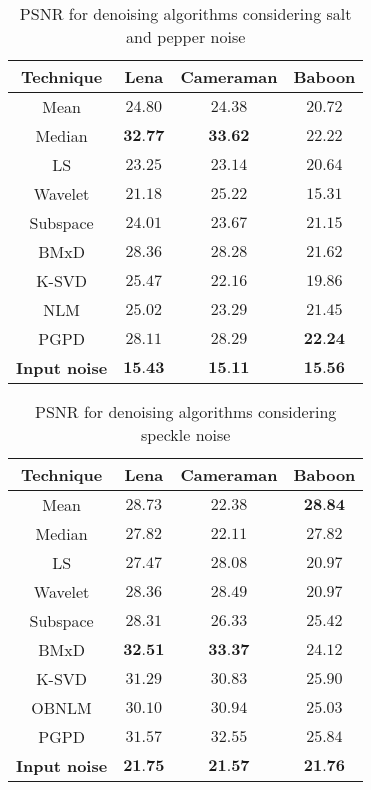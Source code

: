 \begin{table}[H]
	\centering
	\caption{PSNR for denoising algorithms considering salt and pepper noise}
	\begin{tabular}{|c|c|c|c|}
	\hline
	\textbf{Technique} & \textbf{Lena} & \textbf{Cameraman} & \textbf{Baboon} \\ \hline
	Mean & $24.80$ & $24.38$ & $20.72$ \\ \hline
	Median & $\textbf{32.77}$ & $\textbf{33.62}$ & $22.22$\\ \hline
	LS & $23.25$ & $23.14$ & $20.64$ \\ \hline
	Wavelet & $21.18$ & $25.22$ & $15.31$\\ \hline
	Subspace & $24.01$ & $23.67$ & $21.15$ \\ \hline
	BMxD & $28.36$ & $28.28$& $21.62$\\ \hline
	K-SVD & $25.47$  & $22.16$ & $19.86$ \\ \hline
	NLM & $25.02$ & $23.29$ & $21.45$ \\ \hline
	PGPD &$28.11$&$28.29$ & $\textbf{22.24}$ \\ \hline
	\textbf{Input noise} & $\textbf{15.43}$ & $\textbf{15.11}$ & $\textbf{15.56}$ \\ \hline
	\end{tabular}
	\label{tab:numerical_results_sp}
\end{table}

\begin{table}[H]
	\centering
	\caption{PSNR for denoising algorithms considering speckle noise}
	\begin{tabular}{|c|c|c|c|}
	\hline
	\textbf{Technique} & \textbf{Lena} & \textbf{Cameraman} & \textbf{Baboon} \\ \hline
	Mean & $28.73$ & $22.38$ & $\textbf{28.84}$ \\ \hline
	Median & $27.82$ & $22.11$ & $27.82$ \\ \hline
	LS & $27.47$ & $28.08$ & $20.97$ \\ \hline
	Wavelet & $28.36$ & $28.49$ & $20.97 $\\ \hline
	Subspace & $28.31$ & $26.33$ & $25.42$\\ \hline
	BMxD & $\textbf{32.51}$ & $\textbf{33.37}$ & $24.12$\\ \hline
	K-SVD & $31.29$ & $30.83$ & $25.90$ \\ \hline
	OBNLM & $30.10$ & $30.94$ & $25.03$ \\ \hline
	PGPD & $31.57$ & $32.55$ & $25.84$ \\ \hline
	\textbf{Input noise} & $\textbf{21.75}$ & $\textbf{21.57}$ & $\textbf{21.76}$ \\ \hline
	\end{tabular}
	\label{tab:numerical_results_speckle}
\end{table}